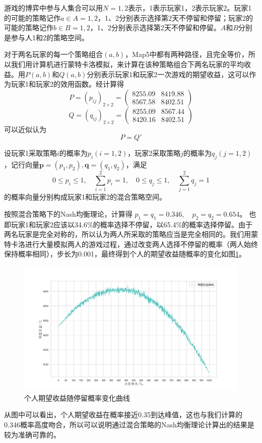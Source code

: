 \documentclass[withoutpre]{cumcmthesis} %
\begin{document}
游戏的博弈中参与人集合可以用$N={1,2}$表示，1表示玩家1，2表示玩家2。玩家1的可能的策略记作$a\in A={1,2}$，1、2分别表示选择第2天不停留和停留；玩家2的可能的策略记作$b\in B={1,2}$，1、2分别表示选择第2天不停留和停留。$A$和$B$分别是参与人1和2的策略空间。

对于两名玩家的每一个策略组合$(a,b)$，Map5中都有两种路径，且完全等价，所以我们用计算机进行蒙特卡洛模拟，来计算在该种策略组合下两名玩家的平均收益。用$P(a,b)$和$Q(a,b)$分别表示玩家1和玩家2一次游戏的期望收益，这可以作为玩家1和玩家2的效用函数。经计算得
\begin{equation}
	P=(p_{ij})_{2\times2}=\begin{pmatrix}
	8255.09&8419.88\\8567.58&8402.51
	\end{pmatrix}
\end{equation}
\begin{equation}
    Q=(q_{ij})_{2\times2}=\begin{pmatrix}
    8255.09&8567.44\\
    8420.16&8402.51
    \end{pmatrix}
\end{equation}
可以近似认为$$P=Q'$$

设玩家1采取策略$i$的概率为$p_i(i=1,2)$，玩家2采取策略$j$的概率为$q_j(j=1,2)$，记行向量$\mathbf{p}=(p_1,p_2),\mathbf{q}=(q_1,q_2)$，满足
$$0\leqslant p_i\leqslant1,\quad\sum_{i=1}^{2}p_i=1,\quad0\leqslant q_j\leqslant1,\quad\sum_{j=1}^{2}q_j=1$$
的概率向量分别构成玩家1和玩家2的混合策略空间。

按照混合策略下的Nash均衡理论，计算得
$p_1=q_1=0.346,\quad p_2=q_2=0.654$。
也即玩家1和玩家2应该以34.6\%的概率选择不停留，以65.4\%的概率选择停留。由于两名玩家是完全对称的，所以认为两人所采取的策略应当是完全相同的。我们用蒙特卡洛进行大量模拟两人的游戏过程，通过改变两人选择不停留的概率（两人始终保持概率相同），步长为0.001，最终得到个人的期望收益随概率的变化如图\ref{fig:shouyi}。
\begin{figure}[H]
	\centering
	\includegraphics[scale=0.4]{figures/shouyi}
	\caption{个人期望收益随停留概率变化曲线}
	\label{fig:shouyi}
\end{figure}
从图中可以看出，个人期望收益在概率接近0.35到达峰值，这也与我们计算的0.346概率高度吻合，所以可以说明通过混合策略的Nash均衡理论计算出的结果是较为准确可靠的。
\end{document}
